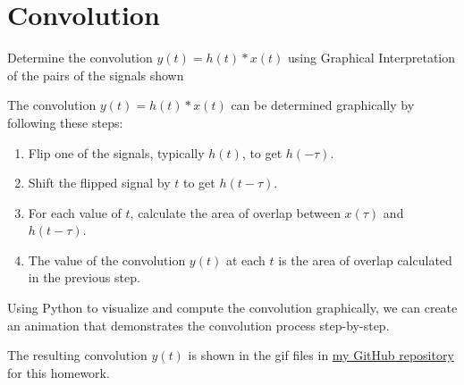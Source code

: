 \documentclass[a4paper, 10pt]{article}
\begin{document}
\subject[2110203 - Computer Engineering Mathematics II]


\section{Convolution}



\begin{problem}[2]
Determine the convolution \( y(t) = h(t)*x(t) \) using Graphical Interpretation of the pairs of the signals shown
\end{problem}

\begin{solution}
The convolution \( y(t) = h(t) * x(t) \) can be determined graphically by following these steps:
\begin{enumerate}
    \item Flip one of the signals, typically \( h(t) \), to get \( h(-\tau) \).
    \item Shift the flipped signal by \( t \) to get \( h(t - \tau) \).
    \item For each value of \( t \), calculate the area of overlap between \( x(\tau) \) and \( h(t - \tau) \).
    \item The value of the convolution \( y(t) \) at each \( t \) is the area of overlap calculated in the previous step.
\end{enumerate}
Using Python to visualize and compute the convolution graphically, we can create an animation that demonstrates the convolution process step-by-step.

\vspace{3mm}

The resulting convolution \( y(t) \) is shown in the gif files in \href{https://github.com/patthadon-p/CEDT-2110203-CEM-II/tree/main/signal/homework-2/images}{my GitHub repository} for this homework.
\end{solution}

\newpage
\end{document}
